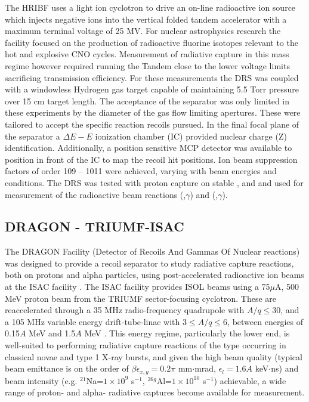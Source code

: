 The HRIBF uses a light ion cyclotron to drive an on-line radioactive ion source which injects negative ions into the vertical folded tandem accelerator with a maximum terminal voltage of 25 MV. For nuclear astrophysics research the facility focused on the production of radioactive fluorine isotopes relevant to the hot and explosive CNO cycles. Measurement of radiative capture in this mass regime however required running the Tandem close to the lower voltage limits sacrificing transmission efficiency. For these measurements the DRS was coupled with a windowless Hydrogen gas target capable of maintaining 5.5 Torr pressure over 15 cm target length. The acceptance of the separator was only limited in these experiments by the diameter of the gas flow limiting apertures. These were tailored to accept the specific reaction recoils pursued. In the final focal plane of the separator a $\Delta{}E-E$ ionization chamber (IC) provided nuclear charge (Z) identification. Additionally, a position sensitive MCP detector was available to position in front of the IC to map the recoil hit positions. Ion beam suppression factors of order 109 -- 1011 were achieved, varying with beam energies and conditions. The DRS was tested with proton capture on stable ,  and  and used for measurement of the radioactive beam reactions (,$\gamma$) and (,$\gamma$). 


\subsection{DRAGON - TRIUMF-ISAC}
The DRAGON Facility (Detector of Recoils And Gammas Of Nuclear reactions) was designed to provide a recoil separator to study radiative capture reactions, both on protons and alpha particles, using post-accelerated radioactive ion beams at the ISAC facility \cite{hut03a,hut03,eng05}. The ISAC facility \cite{ball11} provides ISOL beams using a 75$\mu$A, 500 MeV proton beam from the TRIUMF sector-focusing cyclotron. These are reaccelerated through a 35 MHz radio-frequency quadrupole with $A/q\leq30$, and a 105 MHz variable energy drift-tube-linac with $3\leq A/q\leq6$, between energies of 0.15$A$ MeV and 1.5$A$ MeV \cite{lax02}.  This energy regime, particularly the lower end, is well-suited to performing radiative capture reactions of the type occurring in classical novae and type 1 X-ray bursts, and given the high beam quality (typical beam emittance is on the order of  $\beta\epsilon_{x,y}=0.2\pi$ mm$\cdot$mrad, $\epsilon_{l}=1.6A$ keV$\cdot$ns) and beam intensity (e.g. $^{21}$Na=$1\times10^{9}$ s$^{-1}$, $^{26g}$Al=$1\times10^{10}$ s$^{-1}$) achievable, a wide range of proton- and alpha- radiative captures become available for measurement. 

